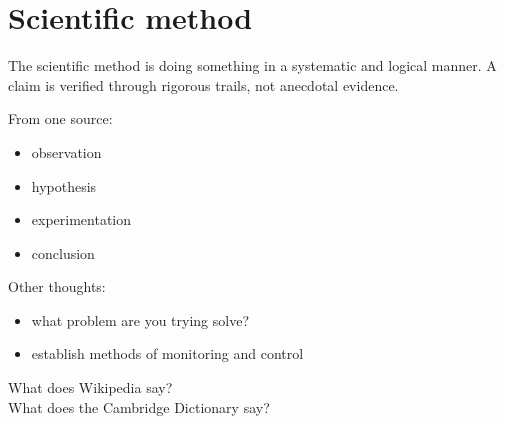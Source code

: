 \chapter{Scientific method}

The scientific method is doing something in a systematic and logical manner. A claim is verified through rigorous trails, not anecdotal evidence.

From one source:
\begin{itemize}
    \item observation
    \item hypothesis
    \item experimentation
    \item conclusion
\end{itemize}

Other thoughts:

\begin{itemize}
    \item what problem are you trying solve?
    \item establish methods of monitoring and control
\end{itemize}

What does Wikipedia say?\\
What does the Cambridge Dictionary say?
